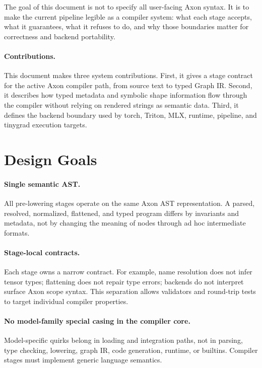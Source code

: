 \documentclass{article}
\begin{document}
The goal of this document is not to specify all user-facing Axon syntax.  It is
to make the current pipeline legible as a compiler system: what each stage
accepts, what it guarantees, what it refuses to do, and why those boundaries
matter for correctness and backend portability.

\paragraph{Contributions.}
This document makes three system contributions.  First, it gives a stage
contract for the active Axon compiler path, from source text to typed Graph IR.
Second, it describes how typed metadata and symbolic shape information flow
through the compiler without relying on rendered strings as semantic data.
Third, it defines the backend boundary used by torch, Triton, MLX, runtime,
pipeline, and tinygrad execution targets.

\section{Design Goals}

\paragraph{Single semantic AST.}
All pre-lowering stages operate on the same Axon AST representation.  A parsed,
resolved, normalized, flattened, and typed program differs by invariants and
metadata, not by changing the meaning of nodes through ad hoc intermediate
formats.

\paragraph{Stage-local contracts.}
Each stage owns a narrow contract.  For example, name resolution does not infer
tensor types; flattening does not repair type errors; backends do not interpret
surface Axon scope syntax.  This separation allows validators and round-trip
tests to target individual compiler properties.

\paragraph{No model-family special casing in the compiler core.}
Model-specific quirks belong in loading and integration paths, not in parsing,
type checking, lowering, graph IR, code generation, runtime, or builtins.
Compiler stages must implement generic language semantics.
\end{document}
